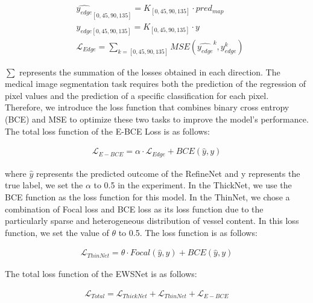 \documentclass[a4paper,fleqn]{cas-dc}
\begin{document}
\begin{align}
    &\hat{y_{edge}}_{[0, 45, 90, 135]}=K_{[0, 45, 90, 135]} \cdot pred_{map} \\
    &y_{edge[0, 45, 90, 135]}=K_{[0, 45, 90, 135]} \cdot y \\
	&\mathcal{L}_{Edge}=  \sum_{k=[0, 45, 90, 135]}^{}  MSE(\hat{y_{edge}}^{k},y_{edge}^{k})
\end{align}

  $\sum$ represents the summation of the losses obtained in each direction. The medical image segmentation task requires both the prediction of the regression of pixel values and the prediction of a specific classification for each pixel. Therefore, we introduce the loss function that combines binary cross entropy (BCE) and MSE to optimize these two tasks to improve the model's performance. The total loss function of the E-BCE Loss is as follows:

\begin{align}
	\mathcal{L}_{E-BCE}= \alpha \cdot \mathcal{L}_{Edge} + BCE(\hat{y},y)
\end{align}

where $\hat{y}$ represents the predicted outcome of the RefineNet and y represents the true label, we set the $\alpha$ to 0.5 in the experiment. In the ThickNet, we use the BCE function as the loss function for this model. In the ThinNet, we chose a combination of Focal loss and BCE loss as its loss function due to the particularly sparse and heterogeneous distribution of vessel content. In this loss function, we set the value of $\theta$ to 0.5. The loss function is as follows:

\begin{align}
	\mathcal{L}_{ThinNet}= \theta \cdot Focal(\hat{y},y) + BCE(\hat{y},y)
\end{align}

The total loss function of the EWSNet is as follows:

\begin{align}
	\mathcal{L}_{Total}= \mathcal{L}_{ThickNet}+\mathcal{L}_{ThinNet}+\mathcal{L}_{E-BCE}
\end{align}
\end{document}
